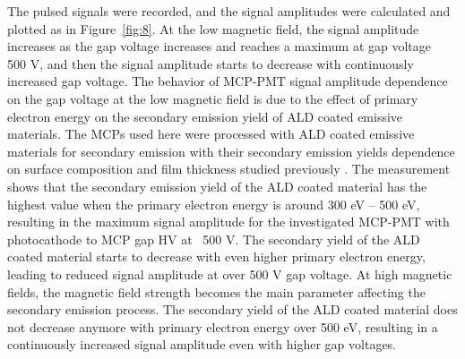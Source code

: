 \documentclass[preprint,5p]{elsarticle}
\begin{document}
The pulsed signals were recorded, and the signal amplitudes were calculated and 
plotted as in Figure~\ref{fig:8}. At the low magnetic field, the signal 
amplitude increases as the gap voltage increases and reaches a maximum at gap 
voltage ~ 500 V, and then the signal amplitude starts to decrease with 
continuously increased gap voltage. The behavior of MCP-PMT signal amplitude 
dependence on the gap voltage at the low magnetic field is due to the effect of 
primary electron energy on the secondary emission yield of ALD coated emissive 
materials. The MCPs used here were processed with ALD coated emissive materials 
for secondary emission with their secondary emission yields dependence on 
surface composition and film thickness studied previously \cite{22}. The 
measurement shows that the secondary emission yield of the ALD coated material 
has the highest value when the primary electron energy is around 300 eV – 500 
eV, resulting in the maximum signal amplitude for the investigated MCP-PMT with 
photocathode to MCP gap HV at ~500 V. The secondary yield of the ALD coated 
material starts to decrease with even higher primary electron energy, leading 
to reduced signal amplitude at over 500 V gap voltage. At high magnetic fields, 
the magnetic field strength becomes the main parameter affecting the secondary 
emission process. The secondary yield of the ALD coated material does not 
decrease anymore with primary electron energy over 500 eV, resulting in a 
continuously increased signal amplitude even with higher gap voltages.
\end{document}

